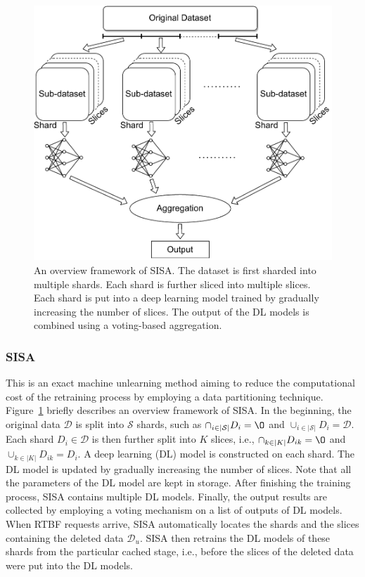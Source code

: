 \begin{figure}[t!]
  \centering
  \includegraphics[width=1.0\linewidth]{assets/shidong_fig1.pdf}
  \caption{An overview framework of SISA. The dataset is first sharded into multiple shards. Each shard is further sliced into multiple slices. Each shard is put into a deep learning model trained by gradually increasing the number of slices. The output of the DL models is combined using a voting-based aggregation.}
  \label{fig:sisa}
\end{figure}


\subsubsection{SISA~\cite{sisa}} This is an exact machine unlearning method aiming to reduce the computational cost of the retraining process by employing a data partitioning technique. Figure~\ref{fig:sisa} briefly describes an overview framework of SISA. In the beginning, the original data $\mathcal{D}$ is split into $\mathcal{S}$ shards, such as $\cap_{i \in |\mathcal{S}|} D_i = \O$ and $\cup_{i \in |\mathcal{S}|} D_i = \mathcal{D}$.
Each shard $D_i \in \mathcal{D}$ is then further split into $K$ slices, i.e.,  $\cap_{k \in |K|} D_{ik} = \O$ and $\cup_{k \in |K|} D_{ik} = D_i$. 
A deep learning (DL) model is constructed on each shard. The DL model is updated by gradually increasing the number of slices. Note that all the parameters of the DL model are kept in storage. After finishing the training process, SISA contains multiple DL models. Finally, the output results are collected by employing a voting mechanism on a list of outputs of DL models. When RTBF requests arrive, SISA automatically locates the shards and the slices containing the deleted data $\mathcal{D}_u$. SISA then retrains the DL models of these shards from the particular cached stage, i.e., before the slices of the deleted data were put into the DL models.


